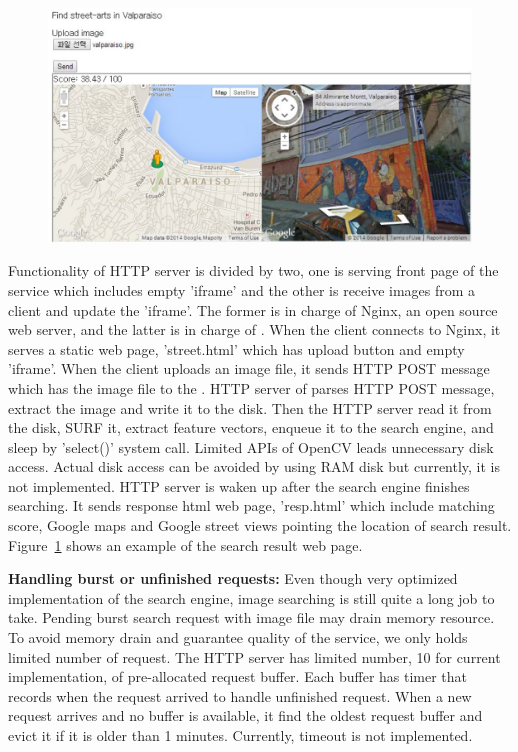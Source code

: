 
\begin{figure}[t]
	\centering
	\includegraphics[scale=0.38]{figs/web_sample}
	\vspace{-0.1in}
	\vspace{-0.1in}
	\label{fig:web_sample}
\end{figure}

Functionality of HTTP server is divided by two, one is serving front page of the service which includes empty 'iframe' and the other is receive images from a client and update the 'iframe'.
The former is in charge of Nginx, an open source web server, and the latter is in charge of \name{}.
When the client connects to Nginx, it serves a static web page, 'street.html' which has upload button and empty 'iframe'.
When the client uploads an image file, it sends HTTP POST message which has the image file to the \name{}.
HTTP server of \name{} parses HTTP POST message, extract the image and write it to the disk.
Then the HTTP server read it from the disk, SURF it, extract feature vectors, enqueue it to the search engine, and sleep by 'select()' system call.
Limited APIs of OpenCV leads unnecessary disk access.
Actual disk access can be avoided by using RAM disk but currently, it is not implemented.
HTTP server is waken up after the search engine finishes searching.
It sends response html web page, 'resp.html' which include matching score, Google maps and Google street views pointing the location of search result.
Figure~\ref{fig:web_sample} shows an example of the search result web page.

\textbf{Handling burst or unfinished requests:}
Even though very optimized implementation of the search engine, image searching is still quite a long job to take.
Pending burst search request with image file may drain memory resource.
To avoid memory drain and guarantee quality of the service, we only holds limited number of request.
The HTTP server has limited number, 10 for current implementation, of pre-allocated request buffer.
Each buffer has timer that records when the request arrived to handle unfinished request.
When a new request arrives and no buffer is available, it find the oldest request buffer and evict it if it is older than 1 minutes.
Currently, timeout is not implemented.
